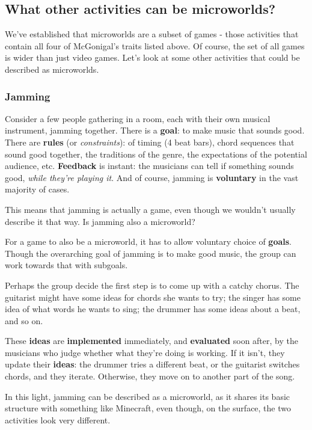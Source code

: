 \subsection{What other activities can be microworlds?}

We've established that microworlds are a subset of games - those
activities that contain all four of McGonigal's traits listed above. Of
course, the set of all games is wider than just video games. Let's look
at some other activities that could be described as microworlds.

\subsubsection{Jamming}

Consider a few people gathering in a room, each with their own musical
instrument, jamming together. There is a \textbf{goal}: to make music
that sounds good. There are \textbf{rules} (or \emph{constraints}): of
timing (4 beat bars), chord sequences that sound good together, the
traditions of the genre, the expectations of the potential audience,
etc. \textbf{Feedback} is instant: the musicians can tell if something
sounds good, \emph{while they're playing it}. And of course, jamming is
\textbf{voluntary} in the vast majority of cases.

This means that jamming is actually a game, even though we wouldn't
usually describe it that way. Is jamming also a microworld?

For a game to also be a microworld, it has to allow voluntary choice of
\textbf{goals}. Though the overarching goal of jamming is to make good
music, the group can work towards that with subgoals.

Perhaps the group decide the first step is to come up with a catchy
chorus. The guitarist might have some ideas for chords she wants to try;
the singer has some idea of what words he wants to sing; the drummer has
some ideas about a beat, and so on.

These \textbf{ideas} are \textbf{implemented} immediately, and
\textbf{evaluated} soon after, by the musicians who judge whether what
they're doing is working. If it isn't, they update their \textbf{ideas}:
the drummer tries a different beat, or the guitarist switches chords,
and they iterate. Otherwise, they move on to another part of the song.

In this light, jamming can be described as a microworld, as it shares
its basic structure with something like Minecraft, even though, on the
surface, the two activities look very different.

